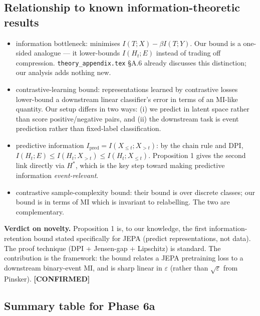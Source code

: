 \documentclass[11pt]{article}
\newcommand{\CONF}{{\color{black!60!green}\textbf{[CONFIRMED]}}}
\begin{document}
\subsection{Relationship to known information-theoretic results}

\begin{itemize}[leftmargin=1.5em]
\item \citet{tishby2000information} information bottleneck: minimises
$I(T;X)-\beta I(T;Y)$. Our bound is a one-sided analogue --- it lower-bounds
$I(H_t;E)$ instead of trading off compression. \texttt{theory\_appendix.tex}
\S A.6 already discusses this distinction; our analysis adds nothing new.

\item \citet{tosh2021contrastive} contrastive-learning bound:
representations learned by contrastive losses lower-bound a downstream
linear classifier's error in terms of an MI-like quantity. Our setup
differs in two ways: (i) we predict in latent space rather than score
positive/negative pairs, and (ii) the downstream task is event prediction
rather than fixed-label classification.

\item \citet{Bialek2001} predictive information $I_{\mathrm{pred}}=
I(X_{\le t};X_{>t})$: by the chain rule and DPI,
$I(H_t;E)\le I(H_t;X_{>t})\le I(H_t;X_{\le t})$. Proposition 1 gives
the second link directly via $H^*$, which is the key step toward
making predictive information \emph{event-relevant}.

\item \citet{Arora2019contrastive} contrastive sample-complexity bound:
their bound is over discrete classes; our bound is in terms of MI which
is invariant to relabelling. The two are complementary.
\end{itemize}

\textbf{Verdict on novelty.} Proposition 1 is, to our knowledge, the
first information-retention bound stated specifically for JEPA (predict
representations, not data). The proof technique (DPI + Jensen-gap +
Lipschitz) is standard. The contribution is the framework: the bound
relates a JEPA pretraining loss to a downstream binary-event MI, and is
sharp linear in $\varepsilon$ (rather than $\sqrt\varepsilon$ from
Pinsker). \CONF

\subsection{Summary table for Phase 6a}
\end{document}
